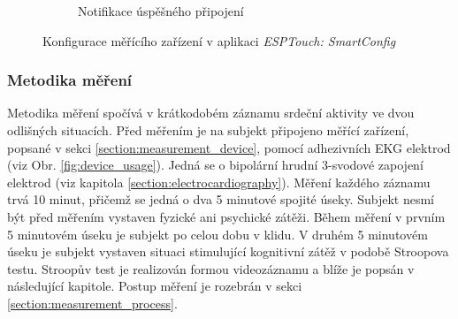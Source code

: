 \begin{figure}[h]
\begin{subfigure}[b]{0.45\textwidth}
        \textcolor{cyan}{\fboxrule=2pt\fboxsep=0pt}
        \caption{Notifikace úspěšného připojení}
        \label{fig:app_screen2}
    \end{subfigure}
    \caption{Konfigurace měřícího zařízení v aplikaci \textit{ESPTouch:
            SmartConfig}}
    \label{fig:esptouch_app}
\end{figure}

\subsubsection{Metodika měření}
\label{section:measurement_methodology}
Metodika měření spočívá v krátkodobém záznamu srdeční aktivity ve dvou odlišných
situacích. Před měřením je na subjekt připojeno měřící zařízení, popsané v sekci
\ref{section:measurement_device}, pomocí adhezivních EKG elektrod (viz Obr.
\ref{fig:device_usage}). Jedná se o bipolární hrudní 3-svodové zapojení elektrod
(viz kapitola \ref{section:electrocardiography}). Měření každého záznamu trvá 10
minut, přičemž se jedná o dva 5 minutové spojité úseky. Subjekt nesmí být před
měřením vystaven fyzické ani psychické zátěži. Během měření v prvním 5 minutovém
úseku je subjekt po celou dobu v klidu. V druhém 5 minutovém úseku je subjekt
vystaven situaci stimulující kognitivní zátěž v podobě Stroopova testu. Stroopův
test je realizován formou videozáznamu a blíže je popsán v následující kapitole.
Postup měření je rozebrán v sekci \ref{section:measurement_process}.

